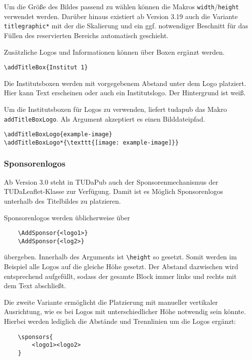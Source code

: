 \documentclass[
	german,
	accentcolor=9c,%
	]{tudapub}
\let\code\texttt
\let\cls\textsf
\begin{document}
Um die Größe des Bildes passend zu wählen können die Makros \code{width}/\code{height} verwendet werden. Darüber hinaus existiert ab Version 3.19 auch die Variante \code{titlegraphic*} mit der die Skalierung und ein ggf. notwendiger Beschnitt für das Füllen des reservierten Bereichs automatisch geschieht.

Zusätzliche Logos und Informationen können über Boxen ergänzt werden.

\begin{verbatim}
\addTitleBox{Institut 1}
\end{verbatim}
Die Institutsboxen werden mit vorgegebenem Abstand unter dem Logo platziert. Hier kann Text erscheinen oder auch ein Institutslogo. Der Hintergrund ist weiß.

Um die Institutsboxen für Logos zu verwenden, liefert \cls{tudapub} das Makro \code{addTitleBoxLogo}. Als Argument akzeptiert es einen Bilddateipfad.

\begin{verbatim}
\addTitleBoxLogo{example-image}
\addTitleBoxLogo*{\texttt{[image: example-image]}}
\end{verbatim}

\subsubsection{Sponsorenlogos}
Ab Version 3.0 steht in TUDaPub auch der Sponsorenmechanismus der TUDaLeaflet-Klasse zur Verfügung. Damit ist es Möglich Sponsorenlogos unterhalb des Titelbildes zu platzieren.

Sponsorenlogos werden üblicherweise über
\begin{verbatim}
	\AddSponsor{<logo1>}
	\AddSponsor{<log2>}
\end{verbatim}
übergeben. Innerhalb des Arguments ist \verb+\height+ so gesetzt. Somit werden im Beispiel alle Logos auf die gleiche Höhe gesetzt. Der Abstand dazwischen wird entsprechend aufgefüllt, sodass der gesamte Block immer links und rechts mit dem Text abschließt.

Die zweite Variante ermöglicht die Platzierung mit manueller vertikaler Ausrichtung, wie es bei Logos mit unterschiedlicher Höhe notwendig sein könnte. Hierbei werden lediglich die Abstände und Trennlinien um die Logos ergänzt:

\begin{verbatim}
	\sponsors{
		<logo1><logo2>
	}
\end{verbatim}
\end{document}
